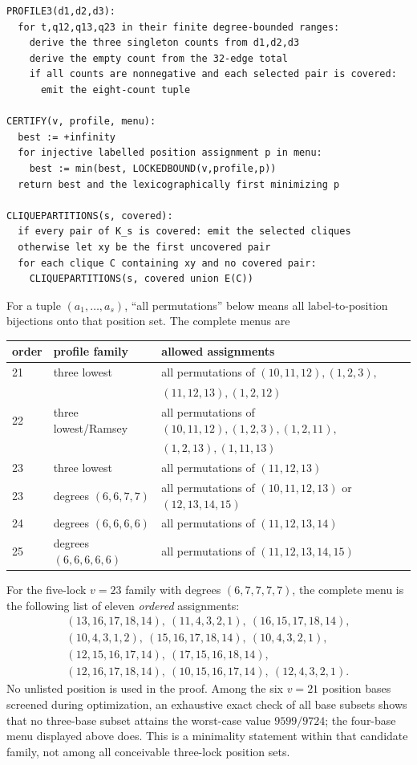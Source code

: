 \documentclass[11pt]{article}
\theoremstyle{remark}
\begin{document}
\begin{verbatim}
PROFILE3(d1,d2,d3):
  for t,q12,q13,q23 in their finite degree-bounded ranges:
    derive the three singleton counts from d1,d2,d3
    derive the empty count from the 32-edge total
    if all counts are nonnegative and each selected pair is covered:
      emit the eight-count tuple

CERTIFY(v, profile, menu):
  best := +infinity
  for injective labelled position assignment p in menu:
    best := min(best, LOCKEDBOUND(v,profile,p))
  return best and the lexicographically first minimizing p

CLIQUEPARTITIONS(s, covered):
  if every pair of K_s is covered: emit the selected cliques
  otherwise let xy be the first uncovered pair
  for each clique C containing xy and no covered pair:
    CLIQUEPARTITIONS(s, covered union E(C))
\end{verbatim}

For a tuple $(a_1,\ldots,a_s)$, ``all permutations'' below means all
label-to-position bijections onto that position set.  The complete menus are
\begin{center}
\begin{tabular}{@{}lll@{}}
\toprule
order & profile family & allowed assignments\\
\midrule
21 & three lowest & all permutations of
  $(10,11,12),(1,2,3),$\\
   & & $(11,12,13),(1,2,12)$\\
22 & three lowest/Ramsey & all permutations of
  $(10,11,12),(1,2,3),(1,2,11),$\\
   & & $(1,2,13),(1,11,13)$\\
23 & three lowest & all permutations of $(11,12,13)$\\
23 & degrees $(6,6,7,7)$ & all permutations of $(10,11,12,13)$ or
  $(12,13,14,15)$\\
24 & degrees $(6,6,6,6)$ & all permutations of $(11,12,13,14)$\\
25 & degrees $(6,6,6,6,6)$ & all permutations of $(11,12,13,14,15)$\\
\bottomrule
\end{tabular}
\end{center}
For the five-lock $v=23$ family with degrees $(6,7,7,7,7)$, the complete
menu is the following list of eleven \emph{ordered} assignments:
\begin{equation}\label{eq:menu-v23}
\begin{gathered}
(13,16,17,18,14),\ (11,4,3,2,1),\ (16,15,17,18,14),\\
(10,4,3,1,2),\ (15,16,17,18,14),\ (10,4,3,2,1),\\
(12,15,16,17,14),\ (17,15,16,18,14),\\
(12,16,17,18,14),\ (10,15,16,17,14),\ (12,4,3,2,1).
\end{gathered}
\end{equation}
No unlisted position is used in the proof.
Among the six $v=21$ position bases screened during optimization, an
exhaustive exact check of all base subsets shows that no three-base subset
attains the worst-case value $9599/9724$; the four-base menu displayed above
does.  This is a minimality statement within that candidate family, not
among all conceivable three-lock position sets.
\end{document}
